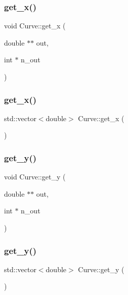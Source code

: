 \subsubsection{\texorpdfstring{get\+\_\+x()}{get\_x()}\hspace{0.1cm}{\footnotesize\ttfamily [1/2]}}
{\footnotesize\ttfamily void Curve\+::get\+\_\+x (\begin{DoxyParamCaption}\item[{double $\ast$$\ast$}]{out,  }\item[{int $\ast$}]{n\+\_\+out }\end{DoxyParamCaption})}

\mbox{\label{class_curve_a69eed37c328a574ba58cd9fa5f15dd9d}} 
\subsubsection{\texorpdfstring{get\+\_\+x()}{get\_x()}\hspace{0.1cm}{\footnotesize\ttfamily [2/2]}}
{\footnotesize\ttfamily std\+::vector$<$double$>$ Curve\+::get\+\_\+x (\begin{DoxyParamCaption}{ }\end{DoxyParamCaption})}

\mbox{\label{class_curve_ab7fbad5767e33a69754db0e0a1f42bae}} 
\subsubsection{\texorpdfstring{get\+\_\+y()}{get\_y()}\hspace{0.1cm}{\footnotesize\ttfamily [1/2]}}
{\footnotesize\ttfamily void Curve\+::get\+\_\+y (\begin{DoxyParamCaption}\item[{double $\ast$$\ast$}]{out,  }\item[{int $\ast$}]{n\+\_\+out }\end{DoxyParamCaption})}

\mbox{\label{class_curve_a1cd5680f5bbfdfb575860b6cc73700ab}} 
\subsubsection{\texorpdfstring{get\+\_\+y()}{get\_y()}\hspace{0.1cm}{\footnotesize\ttfamily [2/2]}}
{\footnotesize\ttfamily std\+::vector$<$double$>$ Curve\+::get\+\_\+y (\begin{DoxyParamCaption}{ }\end{DoxyParamCaption})}

